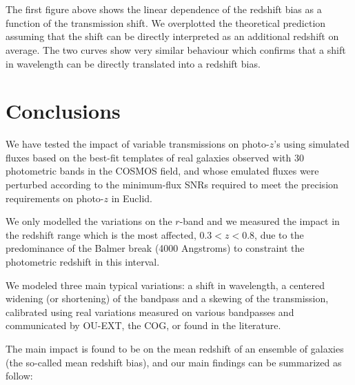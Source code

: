 \documentclass{article}
\begin{document}
    \begin{center}
    \end{center}
    { \hspace*{\fill} \\}
    
    \begin{center}
    \end{center}
    { \hspace*{\fill} \\}
    
    The first figure above shows the linear dependence of the redshift bias
as a function of the transmission shift. We overplotted the theoretical
prediction assuming that the shift can be directly interpreted as an
additional redshift on average. The two curves show very similar
behaviour which confirms that a shift in wavelength can be directly
translated into a redshift bias.

    \hypertarget{conclusions}{%
\section{Conclusions}\label{conclusions}}

We have tested the impact of variable transmissions on photo-\(z\)'s
using simulated fluxes based on the best-fit templates of real galaxies
observed with 30 photometric bands in the COSMOS field, and whose
emulated fluxes were perturbed according to the minimum-flux SNRs
required to meet the precision requirements on photo-\(z\) in Euclid.

We only modelled the variations on the \(r\)-band and we measured the
impact in the redshift range which is the most affected, \(0.3<z<0.8\),
due to the predominance of the Balmer break (4000 Angstroms) to
constraint the photometric redshift in this interval.

We modeled three main typical variations: a shift in wavelength, a
centered widening (or shortening) of the bandpass and a skewing of the
transmission, calibrated using real variations measured on various
bandpasses and communicated by OU-EXT, the COG, or found in the
literature.

The main impact is found to be on the mean redshift of an ensemble of
galaxies (the so-called mean redshift bias), and our main findings can
be summarized as follow:
\end{document}
